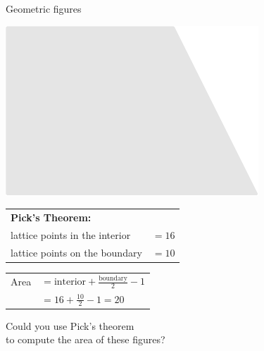 \documentclass[14pt]{beamer}
\begin{document}

    \begin{frame}{Geometric figures}
        \begin{center}        
            \begin{minipage}{0.5\textwidth}%
                \centering \includegraphics[scale=0.70]{figures/figure022c.pdf}
            \end{minipage}\hfill\begin{minipage}{0.49\textwidth} \footnotesize
                \begin{tabular}{ll}
                    \multicolumn{2}{l}{\small \textbf{Pick's Theorem:}} \\[4ex]                
                    lattice points in the interior & $\!\!\!\!\! = 16$  \\[2ex]
                    lattice points on the boundary & $\!\!\!\!\! = 10$  \\
                \end{tabular}
                
                \bigskip \medskip
            
                \begin{tabular}{ll}                
                    Area & $\!\!\!\!\!= \text{interior} + \frac{\text{boundary}}{2} - 1$ \\[2ex]
                         & $\!\!\!\!\!= 16 + \frac{10}{2} - 1 = 20$                 
                \end{tabular}
                
            \end{minipage}

            \bigskip \bigskip

            Could you use Pick's theorem\\to compute the area of these figures?
        \end{center}
        
    \end{frame}
\end{document}
